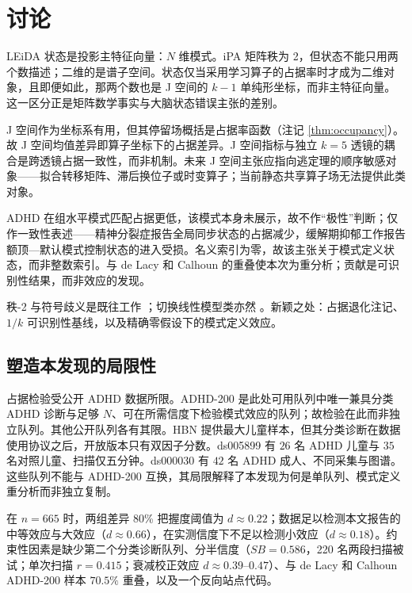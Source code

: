 \documentclass[11pt]{ctexart}
\theoremstyle{definition}
\begin{document}
\section{讨论}
\label{sec:discussion}

LEiDA 状态是投影主特征向量：$N$ 维模式。iPA 矩阵秩为 2，但状态不能只用两个数描述；二维的是谱子空间。状态仅当采用学习算子的占据率时才成为二维对象，且即便如此，那两个数也是 J 空间的 $k-1$ 单纯形坐标，而非主特征向量。这一区分正是矩阵数学事实与大脑状态错误主张的差别。

J 空间作为坐标系有用，但其停留场概括是占据率函数（注记 \ref{thm:occupancy}）。故 J 空间均值差异即算子坐标下的占据差异。J 空间指标与独立 $k=5$ 透镜的耦合是跨透镜占据一致性，而非机制。未来 J 空间主张应指向逃定理的顺序敏感对象——拟合转移矩阵、滞后换位子或时变算子；当前静态共享算子场无法提供此类对象。

ADHD 在组水平模式匹配占据更低，该模式本身未展示，故不作“极性”判断；仅作一致性表述——精神分裂症报告全局同步状态的占据减少\cite{Farinha2022}，缓解期抑郁工作报告额顶—默认模式控制状态的进入受损\cite{Figueroa2019}。名义索引为零，故该主张关于模式定义状态，而非整数索引。与 de Lacy 和 Calhoun 的重叠使本次为重分析；贡献是可识别性结果，而非效应的发现。

秩-2 与符号歧义是既往工作 \cite{Glerean2012,Olsen2022,EiDA2024}；切换线性模型类亦然 \cite{Linderman2017,Taghia2018}。新颖之处：占据退化注记、$1/k$ 可识别性基线，以及精确零假设下的模式定义效应。

\subsection*{塑造本发现的局限性}

占据检验受公开 ADHD 数据所限。ADHD-200 是此处可用队列中唯一兼具分类 ADHD 诊断与足够 $N$、可在所需信度下检验模式效应的队列；故检验在此而非独立队列。其他公开队列各有其限。HBN 提供最大儿童样本，但其分类诊断在数据使用协议之后，开放版本只有双因子分数。ds005899 有 $26$ 名 ADHD 儿童与 $35$ 名对照儿童、扫描仅五分钟。ds000030 有 $42$ 名 ADHD 成人、不同采集与图谱。这些队列不能与 ADHD-200 互换，其局限解释了本发现为何是单队列、模式定义重分析而非独立复制。

在 $n=665$ 时，两组差异 80\% 把握度阈值为 $d\approx0.22$；数据足以检测本文报告的中等效应与大效应（$d\approx0.66$），在实测信度下不足以检测小效应（$d\approx0.18$）。约束性因素是缺少第二个分类诊断队列、分半信度（$SB=0.586$，220 名两段扫描被试；单次扫描 $r=0.415$；衰减校正效应 $d\approx0.39$--$0.47$）、与 de Lacy 和 Calhoun \cite{deLacy2019} ADHD-200 样本 $70.5\%$ 重叠，以及一个反向站点代码。
\end{document}
